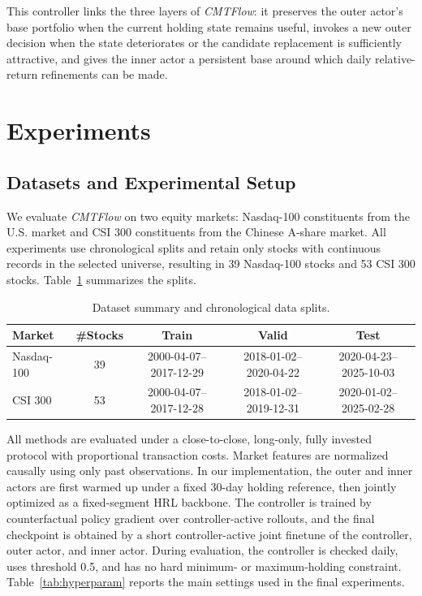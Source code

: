 \documentclass[letterpaper]{article} %
\begin{document}
This controller links the three layers of \textit{CMTFlow}: it preserves the outer actor's base portfolio when the current holding state remains useful, invokes a new outer decision when the state deteriorates or the candidate replacement is sufficiently attractive, and gives the inner actor a persistent base around which daily relative-return refinements can be made.

\section{Experiments}
\subsection{Datasets and Experimental Setup}

We evaluate \textit{CMTFlow} on two equity markets: Nasdaq-100 constituents from the U.S. market and CSI 300 constituents from the Chinese A-share market. All experiments use chronological splits and retain only stocks with continuous records in the selected universe, resulting in 39 Nasdaq-100 stocks and 53 CSI 300 stocks. Table~\ref{tab:dataset} summarizes the splits.

\begin{table}[t]
\centering
\caption{Dataset summary and chronological data splits.}
\label{tab:dataset}
\small
\setlength{\tabcolsep}{3.5pt}
\begin{tabular}{lcccc}
\toprule
\textbf{Market} & \textbf{\#Stocks} & \textbf{Train} & \textbf{Valid} & \textbf{Test} \\
\midrule
Nasdaq-100 & 39 & 2000-04-07--2017-12-29 & 2018-01-02--2020-04-22 & 2020-04-23--2025-10-03 \\
CSI 300 & 53 & 2000-04-07--2017-12-28 & 2018-01-02--2019-12-31 & 2020-01-02--2025-02-28 \\
\bottomrule
\end{tabular}
\end{table}

All methods are evaluated under a close-to-close, long-only, fully invested protocol with proportional transaction costs. Market features are normalized causally using only past observations. In our implementation, the outer and inner actors are first warmed up under a fixed 30-day holding reference, then jointly optimized as a fixed-segment HRL backbone. The controller is trained by counterfactual policy gradient over controller-active rollouts, and the final checkpoint is obtained by a short controller-active joint finetune of the controller, outer actor, and inner actor. During evaluation, the controller is checked daily, uses threshold 0.5, and has no hard minimum- or maximum-holding constraint. Table~\ref{tab:hyperparam} reports the main settings used in the final experiments.
\end{document}
